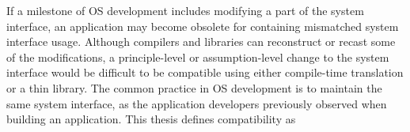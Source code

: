 



If a milestone of OS development includes modifying a part of the system interface,
an application may become obsolete
for containing mismatched system interface usage.
Although compilers and libraries can reconstruct or recast some of the modifications,
a principle-level or assumption-level change to the system interface
would be difficult to be compatible
using either compile-time translation or a thin library.
The common practice in OS development is to maintain
the same system interface,
as the application developers previously observed when building an application.
This thesis defines compatibility as



